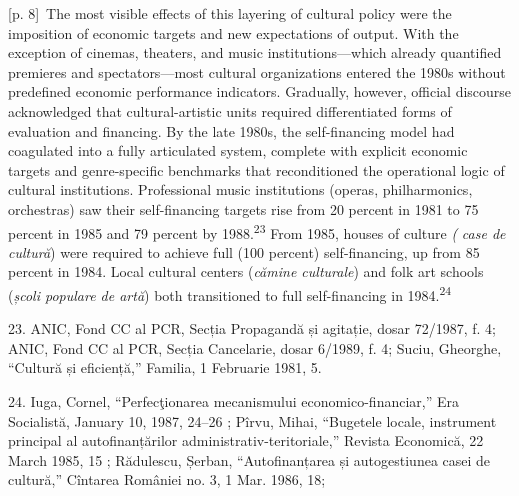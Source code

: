 \documentclass[10pt,a4paper]{article}
\begin{document}
{\scriptsize\color{gray} [p. 8]}\ The most visible effects of this layering of cultural policy were the imposition of economic targets and new expectations of output. With the exception of cinemas, theaters, and music institutions—which already quantified premieres and spectators—most cultural organizations entered the 1980s without predefined economic performance indicators. Gradually, however, official discourse acknowledged that cultural-artistic units required differentiated forms of evaluation and financing. By the late 1980s, the self-financing model had coagulated into a fully articulated system, complete with explicit economic targets and genre-specific benchmarks that reconditioned the operational logic of cultural institutions. Professional music institutions (operas, philharmonics, orchestras) saw their self-financing targets rise from 20 percent in 1981 to 75 percent in 1985 and 79 percent by 1988.\nobreak\textsuperscript{23} From 1985, houses of culture \textit{(} \textit{case de cultură}) were required to achieve full (100 percent) self-financing, up from 85 percent in 1984. Local cultural centers (\textit{cămine culturale}) and folk art schools (\textit{școli populare de artă}) both transitioned to full self-financing in 1984.\nobreak\textsuperscript{24}\par{\small 23. ANIC, Fond CC al PCR, Secția Propagandă și agitație, dosar 72/1987, f. 4; ANIC, Fond CC al PCR, Secția Cancelarie, dosar 6/1989, f. 4; Suciu, Gheorghe, “Cultură și eficiență,” Familia, 1 Februarie 1981, 5.\par}{\small 24. Iuga, Cornel, “Perfecţionarea mecanismului economico-financiar,” Era Socialistă, January 10, 1987, 24–26 ; Pîrvu, Mihai, “Bugetele locale, instrument principal al autofinanțărilor administrativ-teritoriale,” Revista Economică, 22 March 1985, 15 ; Rădulescu, Șerban, “Autofinanțarea și autogestiunea casei de cultură,” Cîntarea României no. 3, 1 Mar. 1986, 18;\par}
\end{document}
